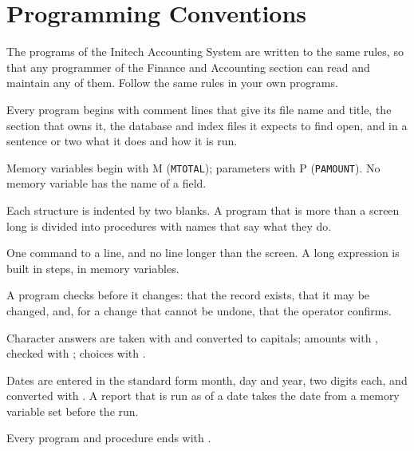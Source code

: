 \chapter{Programming Conventions}
The programs of the Initech Accounting System are written to the same rules,
so that any programmer of the Finance and Accounting section can read and
maintain any of them.  Follow the same rules in your own programs.

Every program begins with comment lines that give its
file name and title, the section that owns it, the database and index files it
expects to find open, and in a sentence or two what it does and how it is run.

Memory variables begin with M (\texttt{MTOTAL}); parameters with P
(\texttt{PAMOUNT}).  No memory variable has the name of a field.

Each structure is indented by two blanks.  A program that is
more than a screen long is divided into procedures with names that say what
they do.

One command to a line, and no line longer than the screen.  A
long expression is built in steps, in memory variables.

A program checks before it changes: that the record
exists, that it may be changed, and, for a change that cannot be undone, that
the operator confirms.

Character answers are taken with  and converted to
capitals; amounts with , checked with ; choices with
.

Dates are entered in the standard form month, day and year,
two digits each, and converted with .  A report that is run as of a
date takes the date from a memory variable set before the run.

Every program and procedure ends with .
